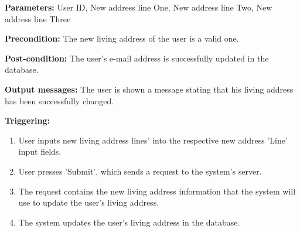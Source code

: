  \begin{description}

\item \textbf{Parameters:} User ID, New address line One, New address line Two,
New address line Three

\item \textbf{Precondition:} The new living address of the user is a valid one.

\item \textbf{Post-condition:} The user's e-mail address is successfully updated
in the database.

\item \textbf{Output messages:} The user is shown a message stating that his
living address has been successfully changed.

\item \textbf{Triggering:}
\begin{enumerate}
\item User inputs new living address lines' into the respective new address
'Line' input fields.

\item User presses 'Submit', which sends a request to the system's server.

\item The request contains the new living address information that the system
will use to update the user's living address.

\item The system updates the user's living address in the database.

\end{enumerate}

\end{description}

